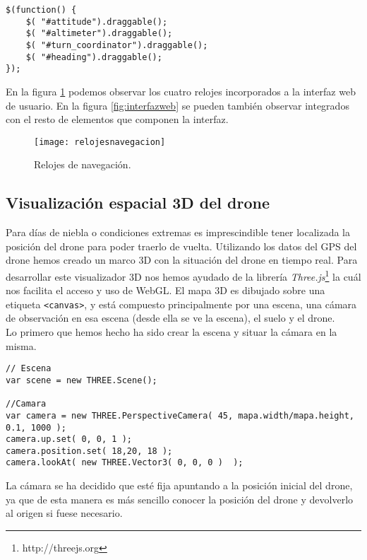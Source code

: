 \begin{lstlisting}[caption=Elementos arrastrables.]
$(function() {
    $( "#attitude").draggable();
    $( "#altimeter").draggable();
    $( "#turn_coordinator").draggable();
    $( "#heading").draggable();
});
\end{lstlisting}

En la figura \ref{fig:relojesnavegacion} podemos observar los cuatro relojes incorporados a la interfaz web de usuario. En la figura \ref{fig:interfazweb} se pueden también observar integrados con el resto de elementos que componen la interfaz.\\

\begin{figure}[h!]
\centering
\texttt{[image: relojesnavegacion]}
\caption{Relojes de navegación.}
\label{fig:relojesnavegacion}
\end{figure}

\subsection{Visualización espacial 3D del drone}

Para días de niebla o condiciones extremas es imprescindible tener localizada la posición del drone para poder traerlo de vuelta. Utilizando los datos del GPS del drone hemos creado un marco 3D con la situación del drone en tiempo real. Para desarrollar este visualizador 3D nos hemos ayudado de la librería \emph{Three.js}\footnote{http://threejs.org} la cuál nos facilita el acceso y uso de WebGL. El mapa 3D es dibujado sobre una etiqueta \texttt{<canvas>}, y está compuesto principalmente por una escena, una cámara de observación en esa escena (desde ella se ve la escena), el suelo y el drone.\\

Lo primero que hemos hecho ha sido crear la escena y situar la cámara en la misma.\\

\begin{lstlisting}[caption=Escena y cámara en el mapa 3D.]
// Escena
var scene = new THREE.Scene();

//Camara
var camera = new THREE.PerspectiveCamera( 45, mapa.width/mapa.height, 0.1, 1000 );
camera.up.set( 0, 0, 1 );
camera.position.set( 18,20, 18 );
camera.lookAt( new THREE.Vector3( 0, 0, 0 )  );
\end{lstlisting}

La cámara se ha decidido que esté fija apuntando a la posición inicial del drone, ya que de esta manera es más sencillo conocer la posición del drone y devolverlo al origen si fuese necesario.\\

